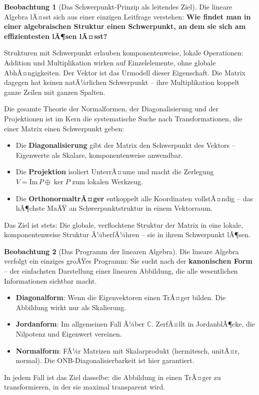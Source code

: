 ﻿\documentclass[a4paper,12pt]{report}
\theoremstyle{definition}
\newtheorem{beobachtung}{Beobachtung}
\begin{document}
\begin{beobachtung}[Das Schwerpunkt-Prinzip als leitendes Ziel]
    Die lineare Algebra lÃ¤sst sich aus einer einzigen Leitfrage verstehen:
    \textbf{Wie findet man in einer algebraischen Struktur einen Schwerpunkt,
    an dem sie sich am effizientesten lÃ¶sen lÃ¤sst?}

    Strukturen mit Schwerpunkt erlauben komponentenweise, lokale Operationen:
    Addition und Multiplikation wirken auf Einzelelemente, ohne globale
    AbhÃ¤ngigkeiten. Der Vektor ist das Urmodell dieser Eigenschaft.
    Die Matrix dagegen hat keinen natÃ¼rlichen Schwerpunkt -- ihre
    Multiplikation koppelt ganze Zeilen mit ganzen Spalten.

    Die gesamte Theorie der Normalformen, der Diagonalisierung und der
    Projektionen ist im Kern die systematische Suche nach Transformationen,
    die einer Matrix einen Schwerpunkt geben:
    \begin{itemize}
        \item[-] Die \textbf{Diagonalisierung} gibt der Matrix den Schwerpunkt
              des Vektors -- Eigenwerte als Skalare, komponentenweise anwendbar.
        \item[-] Die \textbf{Projektion} isoliert UnterrÃ¤ume und macht
              die Zerlegung $V = \mathrm{Im}\,P \oplus \ker P$ zum lokalen
              Werkzeug.
        \item[-] Die \textbf{OrthonormaltrÃ¤ger} entkoppelt alle Koordinaten
              vollstÃ¤ndig -- das hÃ¶chste MaÃŸ an Schwerpunktstruktur in
              einem Vektorraum.
    \end{itemize}
    Das Ziel ist stets: Die globale, verflochtene Struktur der Matrix
    in eine lokale, komponentenweise Struktur Ã¼berfÃ¼hren -- sie in
    ihrem Schwerpunkt lÃ¶sen.
\end{beobachtung}

\begin{beobachtung}[Das Programm der linearen Algebra]
    Die lineare Algebra verfolgt ein einziges groÃŸes Programm: Sie sucht
    nach der \textbf{kanonischen Form} -- der einfachsten Darstellung einer
    linearen Abbildung, die alle wesentlichen Informationen sichtbar macht.
    \begin{itemize}
        \item[-] \textbf{Diagonalform}: Wenn die Eigenvektoren einen TrÃ¤ger bilden.
              Die Abbildung wirkt nur als Skalierung.
        \item[-] \textbf{Jordanform}: Im allgemeinen Fall Ã¼ber $\mathbb{C}$.
              ZerfÃ¤llt in JordanblÃ¶cke, die Nilpotenz und Eigenwert vereinen.
        \item[-] \textbf{Normalform}: FÃ¼r Matrizen mit Skalarprodukt
              (hermitesch, unitÃ¤r, normal). Die ONB-Diagonalisierbarkeit ist
              hier garantiert.
    \end{itemize}
    In jedem Fall ist das Ziel dasselbe: die Abbildung in einen TrÃ¤ger zu
    transformieren, in der sie maximal transparent wird.
\end{beobachtung}
\end{document}
